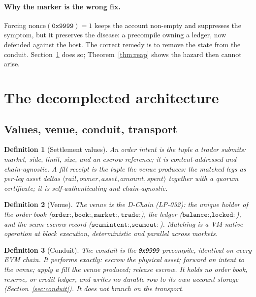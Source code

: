 \documentclass[11pt,a4paper]{article}
\newtheorem{definition}{Definition}[section]
\begin{document}
\paragraph{Why the marker is the wrong fix.} Forcing $\mathrm{nonce}(\texttt{0x9999})=1$ keeps the
account non-empty and suppresses the symptom, but it preserves the disease: a precompile owning a
ledger, now defended against the host. The correct remedy is to remove the state from the conduit.
Section~\ref{sec:arch} does so; Theorem~\ref{thm:reap} shows the hazard then cannot arise.

\section{The decomplected architecture}
\label{sec:arch}

\subsection{Values, venue, conduit, transport}

\begin{definition}[Settlement values]
An \emph{order intent} is the tuple a trader submits: market, side, limit, size, and an escrow
reference; it is content-addressed and chain-agnostic. A \emph{fill receipt} is the tuple the venue
produces: the matched legs as per-leg asset deltas
$\langle \mathit{rail}, \mathit{owner}, \mathit{asset}, \mathit{amount}, \mathit{spent}\rangle$
together with a quorum certificate; it is self-authenticating and chain-agnostic.
\end{definition}

\begin{definition}[Venue]
The \emph{venue} is the D-Chain (LP-032): the unique holder of the order book
($\texttt{order:}, \texttt{book:}, \texttt{market:}, \texttt{trade:}$), the ledger
($\texttt{balance:}, \texttt{locked:}$), and the seam-escrow record
($\texttt{seamintent:}, \texttt{seamout:}$). Matching is a VM-native operation at block execution,
deterministic and parallel across markets.
\end{definition}

\begin{definition}[Conduit]
The \emph{conduit} is the \texttt{0x9999} precompile, identical on every EVM chain. It performs
exactly: escrow the physical asset; forward an intent to the venue; apply a fill the venue
produced; release escrow. It holds no order book, reserve, or credit ledger, and writes no durable
row to its own account storage (Section~\ref{sec:conduit}). It does not branch on the transport.
\end{definition}
\end{document}

